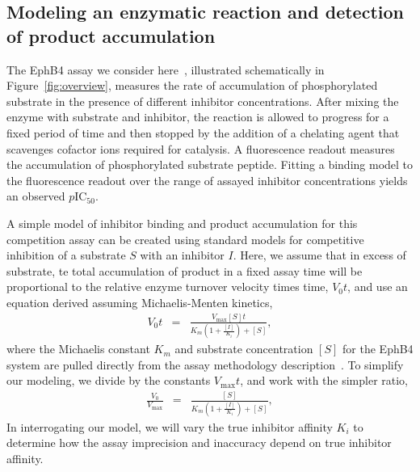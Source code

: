 \documentclass[aps,pre,twocolumn,nofootinbib,superscriptaddress,linenumbers]{revtex4-1}
\begin{document}
\subsection*{Modeling an enzymatic reaction and detection of product accumulation}

The EphB4 assay we consider here~\cite{ekins_dispensing_2013,barlaam_novel_2009,barlaam_pyrimidine_2010}, illustrated schematically in Figure~\ref{fig:overview}, measures the rate of accumulation of phosphorylated substrate in the presence of different inhibitor concentrations.
After mixing the enzyme with substrate and inhibitor, the reaction is allowed to progress for a fixed period of time and then stopped by the addition of a chelating agent that scavenges cofactor ions required for catalysis.
A fluorescence readout measures the accumulation of phosphorylated substrate peptide.
Fitting a binding model to the fluorescence readout over the range of assayed inhibitor concentrations yields an observed $p$IC$_{50}$.

A simple model of inhibitor binding and product accumulation for this competition assay can be created using standard models for competitive inhibition of a substrate $S$ with an inhibitor $I$. 
Here, we assume that in excess of substrate, te total accumulation of product in a fixed assay time will be proportional to the relative enzyme turnover velocity times time, $V_0 t$, and use an equation derived assuming Michaelis-Menten kinetics,
\begin{eqnarray}
V_{0} t &=& \frac{V_\mathrm{max} [S] t}{K_{m}\left(1+\frac{[I]}{K_{i}}\right)+[S]} ,
\end{eqnarray}
where the Michaelis constant $K_{m}$ and substrate concentration $[S]$ for the EphB4 system are pulled directly from the assay methodology description~\cite{barlaam_novel_2009,barlaam_pyrimidine_2010}.
To simplify our modeling, we divide by the constants $V_\mathrm{max} t$, and work with the simpler ratio,
\begin{eqnarray}
\frac{V_{0}}{V_\mathrm{max}} &=& \frac{[S]}{K_{m}\left(1+\frac{[I]}{K_{i}}\right)+[S]} \label{equation:competitive-inhibition} ,
\end{eqnarray}
In interrogating our model, we will vary the true inhibitor affinity $K_{i}$ to determine how the assay imprecision and inaccuracy depend on true inhibitor affinity.
\end{document}
